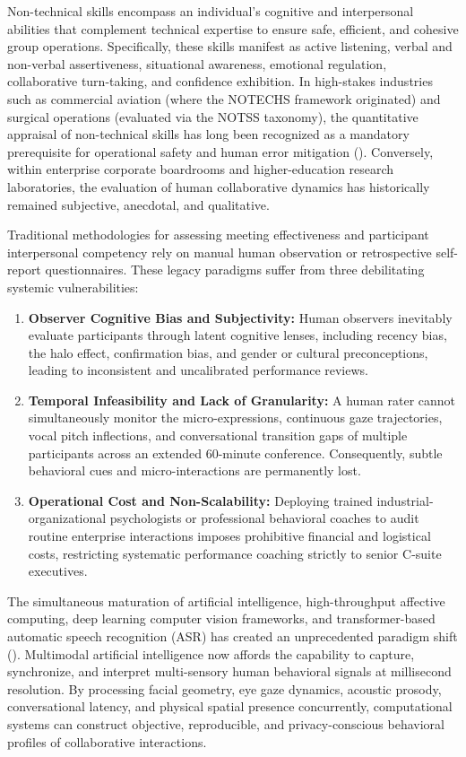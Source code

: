 \documentclass[12pt,a4paper,oneside]{report}
\providecommand{\parencite}[1]{(\cite{#1})}
\begin{document}
Non-technical skills encompass an individual's cognitive and interpersonal abilities that complement technical expertise to ensure safe, efficient, and cohesive group operations. Specifically, these skills manifest as active listening, verbal and non-verbal assertiveness, situational awareness, emotional regulation, collaborative turn-taking, and confidence exhibition. In high-stakes industries such as commercial aviation (where the NOTECHS framework originated) and surgical operations (evaluated via the NOTSS taxonomy), the quantitative appraisal of non-technical skills has long been recognized as a mandatory prerequisite for operational safety and human error mitigation \parencite{fletcher2003notss, vinciarelli2009social}. Conversely, within enterprise corporate boardrooms and higher-education research laboratories, the evaluation of human collaborative dynamics has historically remained subjective, anecdotal, and qualitative.

Traditional methodologies for assessing meeting effectiveness and participant interpersonal competency rely on manual human observation or retrospective self-report questionnaires. These legacy paradigms suffer from three debilitating systemic vulnerabilities:
\begin{enumerate}[label=(\roman*)]
    \item \textbf{Observer Cognitive Bias and Subjectivity:} Human observers inevitably evaluate participants through latent cognitive lenses, including recency bias, the halo effect, confirmation bias, and gender or cultural preconceptions, leading to inconsistent and uncalibrated performance reviews.
    \item \textbf{Temporal Infeasibility and Lack of Granularity:} A human rater cannot simultaneously monitor the micro-expressions, continuous gaze trajectories, vocal pitch inflections, and conversational transition gaps of multiple participants across an extended 60-minute conference. Consequently, subtle behavioral cues and micro-interactions are permanently lost.
    \item \textbf{Operational Cost and Non-Scalability:} Deploying trained industrial-organizational psychologists or professional behavioral coaches to audit routine enterprise interactions imposes prohibitive financial and logistical costs, restricting systematic performance coaching strictly to senior C-suite executives.
\end{enumerate}

The simultaneous maturation of artificial intelligence, high-throughput affective computing, deep learning computer vision frameworks, and transformer-based automatic speech recognition (ASR) has created an unprecedented paradigm shift \parencite{radford2023robust, baevski2020wav2vec}. Multimodal artificial intelligence now affords the capability to capture, synchronize, and interpret multi-sensory human behavioral signals at millisecond resolution. By processing facial geometry, eye gaze dynamics, acoustic prosody, conversational latency, and physical spatial presence concurrently, computational systems can construct objective, reproducible, and privacy-conscious behavioral profiles of collaborative interactions.
\end{document}
